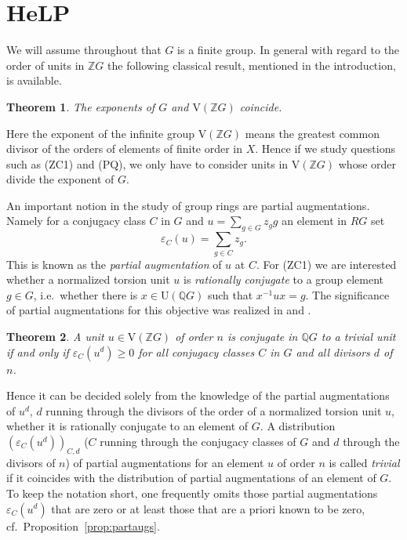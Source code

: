 \documentclass[10pt,a4paper,reqno]{amsart}
\newtheorem{theorem}{Theorem}[section]
\theoremstyle{definition}
\theoremstyle{remark}
\newcommand{\U}{\mathrm{U}}
\newcommand{\V}{\mathrm{V}}
\newcommand{\ZZ}{\mathbb{Z}}
\newcommand{\QQ}{\mathbb{Q}}
\begin{document}
\section{HeLP}\label{sec:HeLP}
We will assume throughout that $G$ is a finite group. In general with regard to the order of units in $\ZZ G$ the following classical result, mentioned in the introduction, is available.

\begin{theorem}\label{th:CL} \cite{CL65}
The exponents of $G$ and $\V(\ZZ G)$ coincide.
\end{theorem}

Here the exponent of the infinite group $\V(\ZZ G)$ means the greatest common divisor of the orders of elements of finite order in $X$. Hence if we study questions such as (ZC1) and (PQ), we only have to consider units in $\V(\ZZ G)$ whose order divide the exponent of $G$. 

An important notion in the study of group rings are partial augmentations. Namely for a conjugacy class $C$  in $G$ and $u = \sum_{g \in G} z_g g$ an element in $R G$ set
$$\varepsilon_C(u) = \sum_{g \in C} z_g. $$
This is known as the \emph{partial augmentation} of $u$ at $C$. For (ZC1) we are interested whether a normalized torsion unit $u$ is \emph{rationally conjugate} to a group element $g \in G$, i.e.\ whether there is $x \in \U(\QQ G)$ such that $x^{-1}ux = g$. The significance of partial augmentations for this objective was realized in \cite{MRSW87} and \cite{LP89}.

\begin{theorem}\label{th:MRSW}\cite[Theorem 2.5]{MRSW87}
A unit $u \in \V(\ZZ G)$ of order $n$ is conjugate in $\QQ G$ to a trivial unit if and only if $\varepsilon_C(u^d) \geqslant 0$ for all conjugacy classes $C$ in $G$ and all divisors $d$ of $n$.
\end{theorem}

Hence it can be decided solely from the knowledge of the partial augmentations of $u^d$, $d$  running through the divisors of the order of a normalized torsion unit $u$, whether it is rationally conjugate to an element of $G$. A distribution $(\varepsilon_C(u^d))_{C,d}$ ($C$ running through the conjugacy classes of $G$ and $d$ through the divisors of $n$) of partial augmentations for an element $u$ of order $n$ is called \emph{trivial} if it coincides with the distribution of partial augmentations of an element of $G$. To keep the notation short, one frequently omits those partial augmentations $\varepsilon_C(u^d)$ that are zero or at least those that are a priori known to be zero, cf.\ Proposition~\ref{prop:partaugs}.
\end{document}
